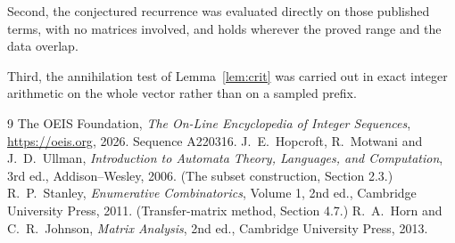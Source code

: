 \documentclass[11pt,a4paper]{article}
\theoremstyle{plain}
\theoremstyle{definition}
\begin{document}
Second, the conjectured recurrence was evaluated directly on those published terms, with no
matrices involved, and holds wherever the proved range and the data overlap.

Third, the annihilation test of Lemma~\ref{lem:crit} was carried out in exact integer
arithmetic on the whole vector rather than on a sampled prefix.

\begin{thebibliography}{9}
 The OEIS Foundation, \emph{The On-Line Encyclopedia of Integer
Sequences}, \url{https://oeis.org}, 2026. Sequence A220316.
 J.~E.~Hopcroft, R.~Motwani and J.~D.~Ullman, \emph{Introduction to Automata
Theory, Languages, and Computation}, 3rd ed., Addison--Wesley, 2006. (The subset
construction, Section 2.3.)
 R.~P.~Stanley, \emph{Enumerative Combinatorics}, Volume 1, 2nd ed.,
Cambridge University Press, 2011. (Transfer-matrix method, Section 4.7.)
 R.~A.~Horn and C.~R.~Johnson, \emph{Matrix Analysis}, 2nd ed., Cambridge
University Press, 2013.
\end{thebibliography}
\end{document}
